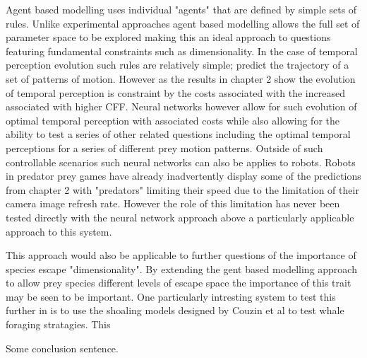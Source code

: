 Agent based modelling uses individual "agents" that are defined by simple sets of rules. Unlike experimental approaches agent based modelling allows the full set of parameter space to be explored making this an ideal approach to questions featuring fundamental constraints such as dimensionality. In the case of temporal perception evolution such rules are relatively simple; predict the trajectory of a set of patterns of motion. However as the results in chapter 2 show the evolution of temporal perception is constraint by the costs associated with the increased associated with higher CFF. Neural networks however allow for such evolution of optimal temporal perception with associated costs while also allowing for the ability to test a series of other related questions including the optimal temporal perceptions for a series of different prey motion patterns. Outside of such controllable scenarios such neural networks can also be applies to robots. Robots in predator prey games have already inadvertently display some of the predictions from chapter 2 with "predators" limiting their speed due to the limitation of their camera image refresh rate. However the role of this limitation has never been tested directly with the neural network approach above a particularly applicable approach to this system.


This approach would also be applicable to further questions of the importance of species escape "dimensionality". By extending the gent based modelling approach to allow prey species different levels of escape space the importance of this trait may be seen to be important. One particularly intresting system to test this further in is to use the shoaling models designed by Couzin et al to test whale foraging stratagies. This 

Some conclusion sentence.











